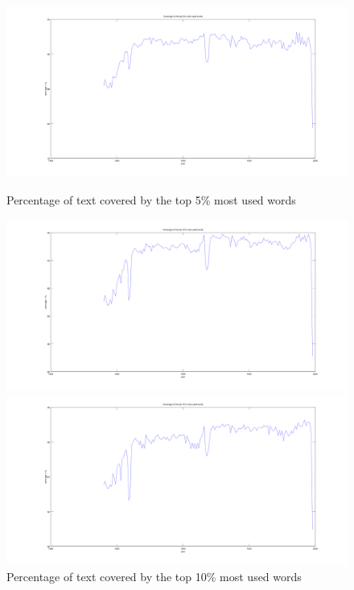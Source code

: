 \begin{figure}[h!]
    \begin{minipage}[b]{0.48\linewidth}
        \includegraphics[scale=0.15]{Pictures/statistics/top-k-words-coverage/graph5.png}
        \caption{Percentage of text covered by the top 5\% most used words}
        \label{coverage_5_percent}
    \end{minipage}\hfill
    \begin{minipage}[b]{0.48\linewidth}
        \includegraphics[scale=0.15]{Pictures/statistics/top-k-words-coverage/graph10.png}
        \caption{Percentage of text covered by the top 10\% most used words}
        \label{coverage_10_percent}
    \end{minipage}\hfill
    \begin{minipage}[b]{0.48\linewidth}
        \includegraphics[scale=0.15]{Pictures/statistics/top-k-words-coverage/graph15.png}

\end{minipage}
\end{figure}
